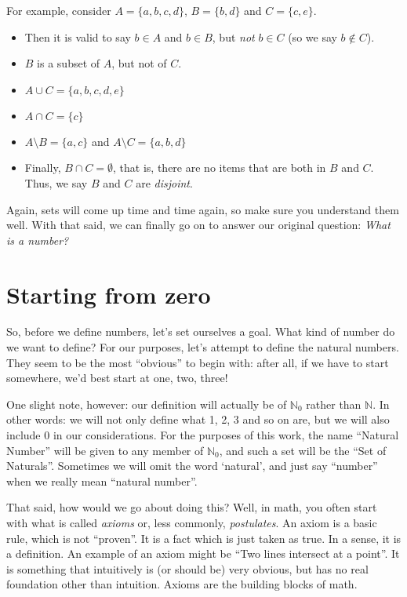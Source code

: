 \documentclass[12pt,a4paper]{article}
\theoremstyle{definition}
\theoremstyle{definition}
\theoremstyle{plain}
\theoremstyle{plain}
\newcommand{\N}{\mathbb{N}}
\begin{document}
	For example, consider $A = \{a, b, c, d\}$, $B = \{b,d\}$ and $C = \{c, e\}$.
	
	\begin{itemize}
	
	\item Then it is valid to say $b \in A$ and $b \in B$, but \emph{not} $b \in C$ (so we say $b \not\in C$).
	
	\item $B$ is a subset of $A$, but not of $C$.
	
	\item $A \cup C = \{a,b,c,d,e\}$
	
	\item $A \cap C = \{c\}$
	
	\item $A \setminus B = \{a,c\}$ and $A \setminus C = \{a,b,d\}$
	
	\item Finally, $B \cap C = \emptyset$, that is, there are no items that are both in $B$ and $C$. Thus, we say $B$ and $C$ are \emph{disjoint}.
	
	\end{itemize}
	
	Again, sets will come up time and time again, so make sure you understand them well. With that said, we can finally go on to answer our original question: \emph{What is a number?}
	
	\section{Starting from zero}
	
	So, before we define numbers, let's set ourselves a goal. What kind of number do we want to define? For our purposes, let's attempt to define the natural numbers. They seem to be the most ``obvious'' to begin with: after all, if we have to start somewhere, we'd best start at one, two, three!
	
	One slight note, however: our definition will actually be of $\N_0$ rather than $\N$. In other words: we will not only define what 1, 2, 3 and so on are, but we will also include 0 in our considerations. For the purposes of this work, the name ``Natural Number'' will be given to any member of $\N_0$, and such a set will be the ``Set of Naturals''. Sometimes we will omit the word `natural', and just say ``number'' when we really mean ``natural number''.
	
	That said, how would we go about doing this? Well, in math, you often start with what is called \emph{axioms} or, less commonly, \emph{postulates}. An axiom is a basic rule, which is not ``proven''. It is a fact which is just taken as true. In a sense, it is a definition. An example of an axiom might be ``Two lines intersect at a point''. It is something that intuitively is (or should be) very obvious, but has no real foundation other than intuition. Axioms are the building blocks of math.
	
\end{document}
